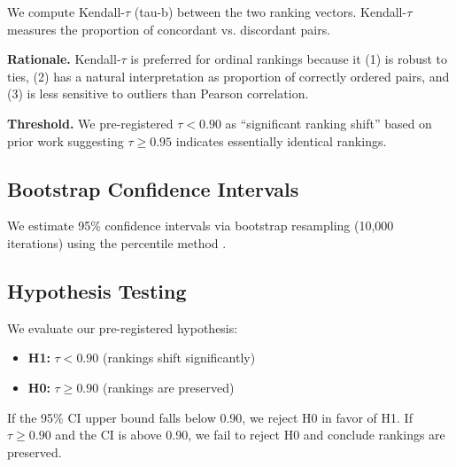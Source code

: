 We compute Kendall-$\tau$ (tau-b) between the two ranking vectors. Kendall-$\tau$ measures the proportion of concordant vs. discordant pairs.

\textbf{Rationale.} Kendall-$\tau$ is preferred for ordinal rankings because it (1) is robust to ties, (2) has a natural interpretation as proportion of correctly ordered pairs, and (3) is less sensitive to outliers than Pearson correlation.

\textbf{Threshold.} We pre-registered $\tau < 0.90$ as ``significant ranking shift'' based on prior work suggesting $\tau \geq 0.95$ indicates essentially identical rankings.

\subsection{Bootstrap Confidence Intervals}

We estimate 95\% confidence intervals via bootstrap resampling (10,000 iterations) using the percentile method \cite{efron1993bootstrap}.

\subsection{Hypothesis Testing}

We evaluate our pre-registered hypothesis:

\begin{itemize}
    \item \textbf{H1:} $\tau < 0.90$ (rankings shift significantly)
    \item \textbf{H0:} $\tau \geq 0.90$ (rankings are preserved)
\end{itemize}

If the 95\% CI upper bound falls below 0.90, we reject H0 in favor of H1. If $\tau \geq 0.90$ and the CI is above 0.90, we fail to reject H0 and conclude rankings are preserved.
